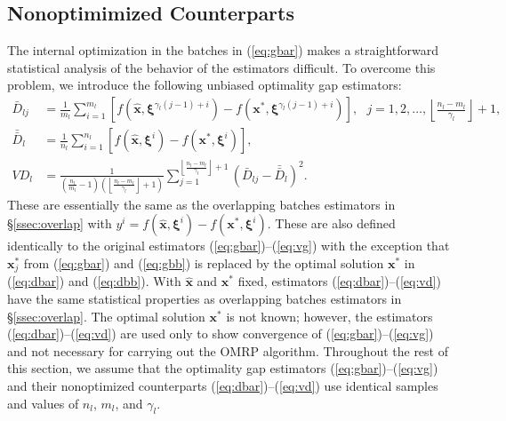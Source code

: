 \documentclass[12pt]{article}
\newcommand{\e}[1]{\mathbb{E} \left[ #1 \right]
}
\newcommand{\x}{\mathbf{x}}
\newcommand{\xh}{{\hat{\x}}}
\newcommand{\xs}{\x^*}
\newcommand{\xit}{\boldsymbol{\xi}}
\newcommand{\xiti}{\xit^i}
\newcommand{\nbl}{\left\lfloor\tfrac{n_l-m_l}{\gamma_l}\right\rfloor+1}
\newcommand{\db}{\bar{D}}
\newcommand{\dbb}{\bar{\db}}
\begin{document}




\subsection{Nonoptimimized Counterparts}
\label{subsec:nonO}

The internal optimization in the batches in (\ref{eq:gbar}) makes a straightforward statistical analysis of the behavior of the estimators difficult.  
To overcome this problem, we introduce the following unbiased optimality gap estimators:
\begin{align}
	\db_{lj} & = \frac{1}{m_l} \sum_{i=1}^{m_l} \left[ f(\xh,\xit^{\gamma_l(j-1)+i}) - f(\xs,\xit^{\gamma_l(j-1)+i}) \right],\ \ \ j = 1, 2, \dots, \nbl, \label{eq:dbar} \\
	\dbb_l & = \frac{1}{n_l} \sum_{i=1}^{n_l} \left[ f(\xh,\xiti) - f(\xs,\xiti) \right], \label{eq:dbb} \\
	VD_l & = \frac{1}{\left( \tfrac{n_l}{m_l} - 1 \right) \left(\nbl\right)} \sum_{j=1}^{\nbl} (\db_{lj} - \dbb_l)^2. \label{eq:vd}
\end{align}
These are essentially the same as the overlapping batches estimators in \S \ref{ssec:overlap} with $y^i = f(\xh,\xiti) - f(\xs,\xiti)$.  
These are also defined identically to the original estimators (\ref{eq:gbar})--(\ref{eq:vg}) with the exception that $\xs_j$ from (\ref{eq:gbar}) and (\ref{eq:gbb}) is replaced by the optimal solution $\xs$ in (\ref{eq:dbar}) and (\ref{eq:dbb}).  
With $\xh$ and $\xs$ fixed, estimators (\ref{eq:dbar})--(\ref{eq:vd}) have the same statistical properties as overlapping batches estimators in \S \ref{ssec:overlap}.  
The optimal solution $\xs$ is not known; however, the estimators (\ref{eq:dbar})--(\ref{eq:vd}) are used only to show convergence of (\ref{eq:gbar})--(\ref{eq:vg}) and not necessary for carrying out the OMRP algorithm.  
Throughout the rest of this section, we assume that the optimality gap estimators (\ref{eq:gbar})--(\ref{eq:vg}) and their nonoptimized counterparts (\ref{eq:dbar})--(\ref{eq:vd}) use identical samples and values of $n_
l$, $m_l$, and $\gamma_l$.  \smallskip 
\end{document}
